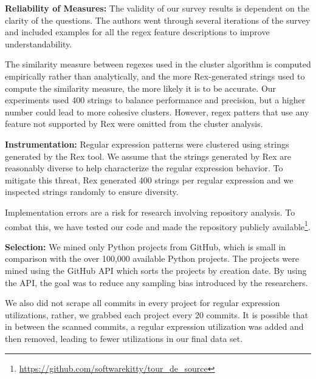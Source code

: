 \documentclass{sig-alternate}
\newcommand{\todoNow}[1]{\textbf{\textcolor{red}{TODO.NOW: #1}}} %
\begin{document}
\textbf{Reliability of Measures:} The validity of our survey results is dependent on the clarity of the questions. The authors went through several iterations of the survey and included examples for all the regex feature descriptions to improve understandability.

The similarity measure between regexes used in the cluster algorithm is computed empirically rather than analytically, and the more Rex-generated strings used to compute the similarity measure, the more likely it is to be accurate. Our experiments used 400 strings to balance performance and precision, but a higher number could lead to more cohesive clusters. However, regex patters that use any feature not supported by Rex were omitted from the cluster analysis. 


\textbf{Instrumentation:} Regular expression patterns were clustered using strings generated by the Rex tool.  We assume that the strings generated by Rex are reasonably diverse to help characterize the regular expression behavior. To mitigate this threat, Rex generated 400 strings per regular expression and we inspected strings randomly to ensure diversity.

Implementation errors are a risk for research involving repository analysis. To combat this, we have tested our code and made the repository publicly available\footnote{\url{https://github.com/softwarekitty/tour_de_source}}.

\textbf{Selection:} We mined only  Python projects from GitHub, which is  small in comparison with the over 100,000 available Python projects. The projects were mined using the GitHub API which sorts the projects by creation date. By using the API, the goal was to reduce any sampling bias introduced by the researchers.

We also did not scrape all commits in every project for regular expression utilizations, rather, we grabbed each project every 20 commits. It is possible that in between the scanned commits, a regular expression utilization was added and then removed, leading to fewer utilizations in our final data set.
\end{document}
